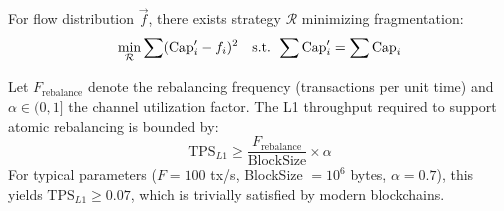 \begin{theorem}
For flow distribution $\vec{f}$, there exists strategy $\mathcal{R}$ minimizing fragmentation:
$$ \min_{\mathcal{R}} \sum (\mathrm{Cap}'_i - f_i)^2 \quad \text{s.t. } \sum \mathrm{Cap}'_i = \sum \mathrm{Cap}_i $$
\end{theorem}
\begin{theorem}
Let $F_{\mathrm{rebalance}}$ denote the rebalancing frequency (transactions per unit time) and $\alpha \in (0,1]$ the channel utilization factor. The L1 throughput required to support atomic rebalancing is bounded by:
$$ \mathrm{TPS}_{L1} \geq \frac{F_{\mathrm{rebalance}}}{\mathrm{BlockSize}} \times \alpha $$
For typical parameters ($F = 100$ tx/s, BlockSize $= 10^6$ bytes, $\alpha = 0.7$), this yields $\mathrm{TPS}_{L1} \geq 0.07$, which is trivially satisfied by modern blockchains.
\end{theorem}
